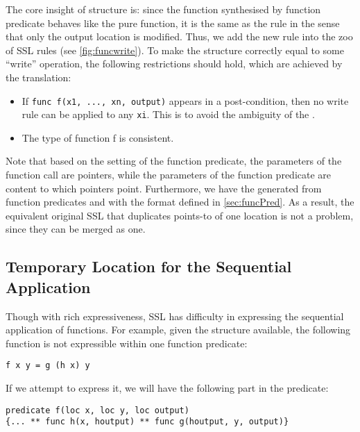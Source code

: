 The core insight of \func structure is: since the function synthesised
by function predicate behaves like the pure function, it is the same
as the \writer rule in the sense that only the output location is
modified. Thus, we add the new \funcwrite rule into the zoo of SSL
rules (see \autoref{fig:funcwrite}).
%
To make the \func structure correctly equal to some ``write''
operation, the following restrictions should hold, which are achieved
by the translation:

\begin{itemize}
    \item If \lstinline[language=SynLang]{func f(x1, ..., xn, output)} appears in a post-condition, then no write rule can be applied to any \lstinline[language = SynLang]{xi}. This is to avoid the ambiguity of the \func.
    \item The type of function f is consistent.
\end{itemize}

Note that based on the setting of the function predicate, the parameters of the function call are pointers, while the parameters of the function predicate are content to which pointers point. Furthermore, we have the \func generated from function predicates and with the format defined in \autoref{sec:funcPred}. As a result, the equivalent original SSL that duplicates points-to of one location is not a problem, since they can be merged as one.

\subsection{Temporary Location for the Sequential Application}

Though with rich expressiveness, SSL has difficulty in expressing the sequential application of functions. For example, given the \func structure available, the following function is not expressible within one function predicate:

\begin{lstlisting}[language=SynLang]
f x y = g (h x) y
\end{lstlisting}

If we attempt to express it, we will have the following part in the predicate:

\begin{lstlisting}[language=SynLang]
predicate f(loc x, loc y, loc output)
{... ** func h(x, houtput) ** func g(houtput, y, output)}
\end{lstlisting}

